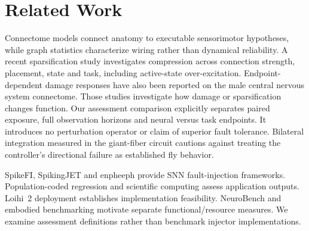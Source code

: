 \section{Related Work}
Connectome models connect anatomy to executable sensorimotor hypotheses\cite{shiu2024drosophila}, while graph statistics characterize wiring rather than dynamical reliability\cite{lin2024network}. A recent sparsification study investigates compression across connection strength, placement, state and task, including active-state over-excitation\cite{an2026sparse}. Endpoint-dependent damage responses have also been reported on the male central nervous system connectome\cite{jo2026simulating}. Those studies investigate how damage or sparsification changes function. Our assessment comparison explicitly separates paired exposure, full observation horizons and neural versus task endpoints. It introduces no perturbation operator or claim of superior fault tolerance. Bilateral integration measured in the giant-fiber circuit\cite{jang2023azimuthal} cautions against treating the controller's directional failure as established fly behavior.

SpikeFI\cite{spyrou2024spikefi}, SpikingJET\cite{gogebakan2024spikingjet} and enpheeph\cite{colucci2022enpheeph} provide SNN fault-injection frameworks. Population-coded regression\cite{gleyo2026population} and scientific computing\cite{theilman2026robustness} assess application outputs. Loihi~2 deployment\cite{wang2025neuromorphic} establishes implementation feasibility. NeuroBench\cite{yik2023neurobench} and embodied benchmarking\cite{dangelo2026embodied} motivate separate functional/resource measures. We examine assessment definitions rather than benchmark injector implementations.
